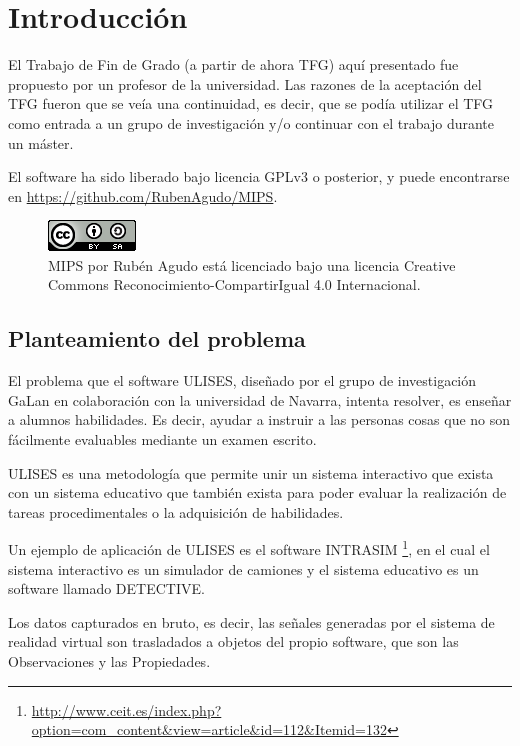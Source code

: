 \chapter{Introducci\'{o}n} 
El Trabajo de Fin de Grado (a partir de ahora TFG) aqu\'{i} presentado fue propuesto por un profesor de la universidad.
Las razones de la aceptaci\'{o}n del TFG fueron que se ve\'{i}a una continuidad, es decir, que se pod\'{i}a 
utilizar el TFG como entrada a un grupo de investigaci\'{o}n y/o continuar con el trabajo durante un m\'{a}ster.

El software ha sido liberado bajo licencia GPLv3 o posterior, y puede encontrarse en 
\url{https://github.com/RubenAgudo/MIPS}.

\begin{figure}[h]
    \centering
    \includegraphics{./Figures/cc-by-sa}
    \caption[Licencia]{MIPS por Rubén Agudo est\'a licenciado bajo una licencia Creative Commons Reconocimiento-CompartirIgual 4.0 Internacional.}
    \label{fig:cc-by-sa}
\end{figure}

\section{Planteamiento del problema}
El problema que el software ULISES, dise\~nado por el grupo de investigaci\'on GaLan en colaboraci\'on
con la universidad de Navarra, intenta resolver, es ense\~nar a alumnos habilidades. Es decir, ayudar a 
instruir a las personas cosas que no son f\'acilmente evaluables mediante un examen escrito.

ULISES es una metodolog\'ia que permite unir un sistema interactivo que exista
con un sistema educativo que tambi\'en exista para poder evaluar la realizaci\'on de tareas procedimentales 
o la adquisici\'on de habilidades.

Un ejemplo de aplicaci\'on de ULISES es el software INTRASIM 
\footnote{\url{http://www.ceit.es/index.php?option=com_content&view=article&id=112&Itemid=132}}, 
en el cual el sistema interactivo es un simulador de camiones y el sistema educativo es un software
llamado DETECTIVE.

Los datos capturados en bruto, es decir, las se\~nales generadas por el sistema de 
realidad virtual son trasladados a objetos del propio software,
que son las Observaciones y las Propiedades.

